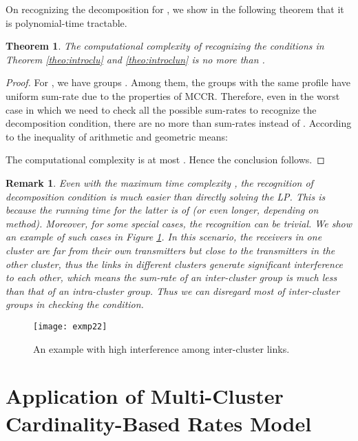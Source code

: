 \documentclass[10pt,onecolumn,journal,draftcls,oneside]{IEEEtran}
\newtheorem{theorem}{Theorem}
\newcounter{cond}
\newcounter{rema}
\newtheorem{remark}[rema]{Remark}
\newcounter{exam}
\begin{document}
On recognizing the decomposition for , we show in the following theorem that it is polynomial-time tractable.

\begin{theorem}
\label{theo:ccc}
The computational complexity of recognizing the conditions in Theorem \ref{theo:introclu} and \ref {theo:introclun} is no more than .
\end{theorem}  

\begin{proof}
For , we have  groups . Among them, the groups with the same profile  have uniform sum-rate due to the properties of MCCR. Therefore, even in the worst case in which we need to check all the possible sum-rates to recognize the decomposition condition, there are no more than  sum-rates instead of . According to the inequality of arithmetic and geometric means:


The computational complexity is at most . Hence the conclusion follows.
\end{proof}

\begin{remark}

Even with the maximum time complexity , the recognition of decomposition condition is much easier than directly solving the LP.
This is because the running time for the latter is of  (or even longer, depending on method).
Moreover, for some special cases, the recognition can be trivial. We show an example of such cases in Figure \ref{fig:exmp2}.
In this scenario, the receivers in one cluster are far from their own transmitters but close to the transmitters in the other cluster, thus the links in different clusters generate significant interference to each other, which means the sum-rate of an inter-cluster group is much less than that of an intra-cluster group. Thus we can disregard most of inter-cluster groups in checking the condition.
\end{remark}


\begin{figure} [ht!]	
\centering
{\texttt{[image: exmp22]}}
\vspace{-2mm}
\caption{An example with high interference among inter-cluster links.}
\label{fig:exmp2}
\end{figure}

\section{Application of Multi-Cluster Cardinality-Based Rates Model}
\label{sec:algorithm}
\end{document}
